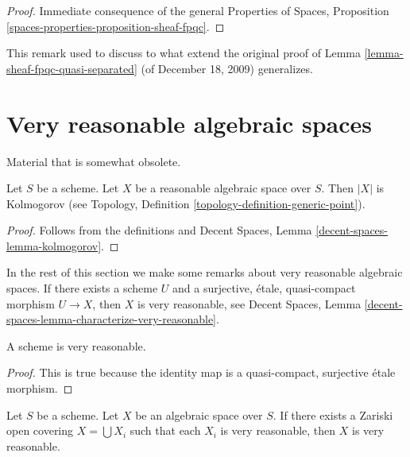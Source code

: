\begin{proof}
Immediate consequence of the general
Properties of Spaces, Proposition
\ref{spaces-properties-proposition-sheaf-fpqc}.
\end{proof}

\begin{remark}
\label{remark-proof-works-when}
This remark used to discuss to what extend the original proof of
Lemma \ref{lemma-sheaf-fpqc-quasi-separated} (of December 18, 2009)
generalizes.
\end{remark}






\section{Very reasonable algebraic spaces}
\label{section-very-reasonable}

\noindent
Material that is somewhat obsolete.

\begin{lemma}
\label{lemma-reasonable-kolmogorov}
Let $S$ be a scheme.
Let $X$ be a reasonable algebraic space over $S$.
Then $|X|$ is Kolmogorov (see
Topology, Definition \ref{topology-definition-generic-point}).
\end{lemma}

\begin{proof}
Follows from the definitions and
Decent Spaces, Lemma \ref{decent-spaces-lemma-kolmogorov}.
\end{proof}

\noindent
In the rest of this section we make some remarks about very reasonable
algebraic spaces. If there exists a scheme $U$ and a
surjective, \'etale, quasi-compact
morphism $U \to X$, then $X$ is very reasonable, see
Decent Spaces, Lemma \ref{decent-spaces-lemma-characterize-very-reasonable}.

\begin{lemma}
\label{lemma-scheme-very-reasonable}
A scheme is very reasonable.
\end{lemma}

\begin{proof}
This is true because the identity map is a quasi-compact, surjective
\'etale morphism.
\end{proof}

\begin{lemma}
\label{lemma-very-reasonable-Zariski-local}
Let $S$ be a scheme.
Let $X$ be an algebraic space over $S$.
If there exists a Zariski open covering $X = \bigcup X_i$ such that
each $X_i$ is very reasonable, then $X$ is very reasonable.
\end{lemma}

